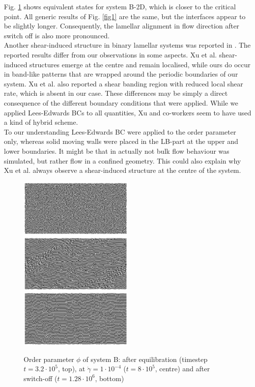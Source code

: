 \documentclass[8.5pt,twoside,twocolumn]{article}
\newcommand{\e}[1]{\cdot10^{#1}}
\begin{document}
Fig. \ref{fig2} shows equivalent states for system B-2D, which is closer to the critical point.
All generic results of Fig. \ref{fig1} are the same, but the interfaces appear to be slightly longer.
Consequently, the lamellar alignment in flow direction after switch off is also more pronounced.\\ 
Another shear-induced structure in binary lamellar systems was reported in \cite{Xu06b}.
The reported results differ from our observations in some aspects.
Xu et al. shear-induced structures emerge at the centre and remain localised, while ours do occur in band-like patterns that are wrapped around the periodic boundaries of our system.
Xu et al. also reported a shear banding region with reduced local shear rate, which is absent in our case.
These differences may be simply a direct consequence of the different boundary conditions that were applied.
While we applied Lees-Edwards BCs to all quantities, Xu and co-workers seem to have used a kind of hybrid scheme.\\
To our understanding Lees-Edwards BC were applied to the order parameter only, whereas solid moving walls were placed in the LB-part at the upper and lower boundaries.
It might be that in \cite{Xu06b} actually not bulk flow behaviour was simulated, but rather flow in a confined geometry. 
This could also explain why Xu et al. always observe a shear-induced structure at the centre of the system.\\ 

\begin{figure}[htp]
\centering
\includegraphics[angle=0,width=0.5\textwidth]{phi_run707_320.jpg}\\
\includegraphics[angle=0,width=0.5\textwidth]{phi_run710_800.jpg}\\
\includegraphics[angle=0,width=0.5\textwidth]{phi_run765_1280.jpg}
\caption{Order parameter $\phi$ of system B: after equilibration (timestep $t=3.2\e{5}$, top), at $\dot{\gamma}=1\cdot10^{-4}$ ($t=8\e{5}$, centre) and after switch-off ($t=1.28\e{6}$, bottom)}
\label{fig2}
\end{figure}
\end{document}
